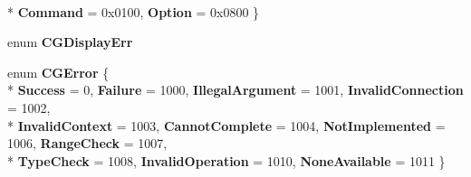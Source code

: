 \begin{DoxyCompactItemize}
\\*
{\bfseries Command} = 0x0100, 
{\bfseries Option} = 0x0800
 \}
\item 
enum {\bfseries C\-G\-Display\-Err} 
\item 
enum {\bfseries C\-G\-Error} \{ \\*
{\bfseries Success} = 0, 
{\bfseries Failure} = 1000, 
{\bfseries Illegal\-Argument} = 1001, 
{\bfseries Invalid\-Connection} = 1002, 
\\*
{\bfseries Invalid\-Context} = 1003, 
{\bfseries Cannot\-Complete} = 1004, 
{\bfseries Not\-Implemented} = 1006, 
{\bfseries Range\-Check} = 1007, 
\\*
{\bfseries Type\-Check} = 1008, 
{\bfseries Invalid\-Operation} = 1010, 
{\bfseries None\-Available} = 1011
 \}
\end{DoxyCompactItemize}
